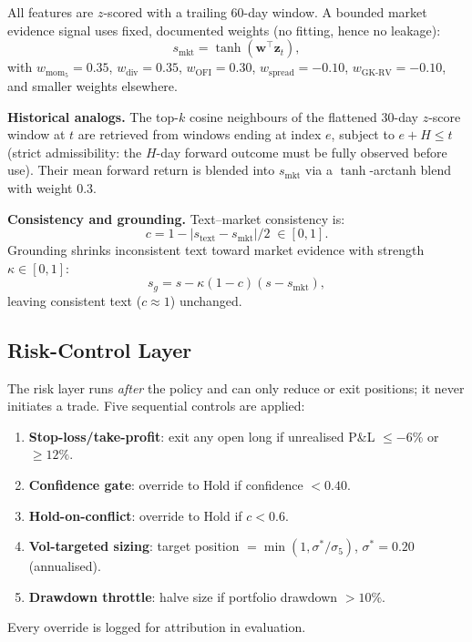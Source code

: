 \documentclass[conference]{IEEEtran}
\begin{document}
All features are $z$-scored with a trailing 60-day window.
A bounded market evidence signal uses fixed, documented weights
(no fitting, hence no leakage):
\begin{equation}
  s_{\mathrm{mkt}} = \tanh(\mathbf{w}^{\top} \mathbf{z}_t),
\end{equation}
with $w_{\mathrm{mom}_5}{=}0.35$, $w_{\mathrm{div}}{=}0.35$,
$w_{\mathrm{OFI}}{=}0.30$, $w_{\mathrm{spread}}{=}{-}0.10$,
$w_{\mathrm{GK\text{-}RV}}{=}{-}0.10$, and smaller weights elsewhere.

\textbf{Historical analogs.}
The top-$k$ cosine neighbours of the flattened 30-day $z$-score window
at $t$ are retrieved from windows ending at index $e$, subject to
$e + H \le t$ (strict admissibility: the $H$-day forward outcome must be
fully observed before use).
Their mean forward return is blended into $s_{\mathrm{mkt}}$ via a
$\tanh$-arctanh blend with weight 0.3.

\textbf{Consistency and grounding.}
Text--market consistency is:
\begin{equation}
  c = 1 - |s_{\mathrm{text}} - s_{\mathrm{mkt}}| / 2 \;\in [0,1].
\end{equation}
Grounding shrinks inconsistent text toward market evidence with
strength $\kappa \in [0,1]$:
\begin{equation}
  s_g = s - \kappa (1 - c)(s - s_{\mathrm{mkt}}),
  \label{eq:grounding}
\end{equation}
leaving consistent text ($c \approx 1$) unchanged.

\subsection{Risk-Control Layer}\label{sec:risk}

The risk layer runs \emph{after} the policy and can only reduce or exit
positions; it never initiates a trade.
Five sequential controls are applied:
\begin{enumerate}
  \item \textbf{Stop-loss/take-profit}: exit any open long if unrealised
        P\&L $\le -6\%$ or $\ge 12\%$.
  \item \textbf{Confidence gate}: override to Hold if confidence $< 0.40$.
  \item \textbf{Hold-on-conflict}: override to Hold if $c < 0.6$.
  \item \textbf{Vol-targeted sizing}: target position
        $= \min(1, \sigma^* / \sigma_5)$, $\sigma^* = 0.20$ (annualised).
  \item \textbf{Drawdown throttle}: halve size if portfolio drawdown $> 10\%$.
\end{enumerate}
Every override is logged for attribution in evaluation.
\end{document}
